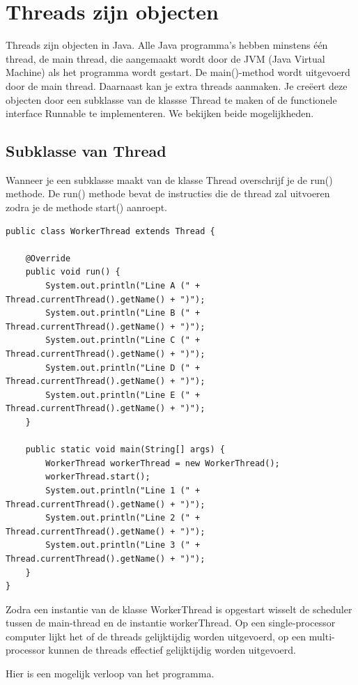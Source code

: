 \documentclass{tstextbook}
\begin{document}
\section{Threads zijn objecten}

Threads zijn objecten in Java. 
Alle Java programma's hebben minstens \'e\'en thread, de main thread, die aangemaakt wordt door de JVM (Java Virtual Machine) als het programma wordt gestart. De main()-method wordt uitgevoerd door de main thread. 
Daarnaast kan je extra threads aanmaken.
Je cre\"eert deze objecten
door een subklasse van de klassse Thread te maken of de functionele interface Runnable te implementeren. We bekijken beide mogelijkheden.

\subsection{Subklasse van Thread}

Wanneer je een subklasse maakt van de klasse Thread overschrijf je de run() methode. De run() methode bevat de instructies die de thread zal uitvoeren zodra je de methode start() aanroept.

\begin{lstlisting}
public class WorkerThread extends Thread {

	@Override
	public void run() {
		System.out.println("Line A (" + Thread.currentThread().getName() + ")");
		System.out.println("Line B (" + Thread.currentThread().getName() + ")");
		System.out.println("Line C (" + Thread.currentThread().getName() + ")");
		System.out.println("Line D (" + Thread.currentThread().getName() + ")");
		System.out.println("Line E (" + Thread.currentThread().getName() + ")");
	}

	public static void main(String[] args) {
		WorkerThread workerThread = new WorkerThread();
		workerThread.start();
		System.out.println("Line 1 (" + Thread.currentThread().getName() + ")");
		System.out.println("Line 2 (" + Thread.currentThread().getName() + ")");
		System.out.println("Line 3 (" + Thread.currentThread().getName() + ")");
	}
}
\end{lstlisting}

Zodra een instantie van de klasse WorkerThread is opgestart wisselt de scheduler tussen de main-thread en de instantie workerThread. Op een single-processor computer lijkt het of de threads gelijktijdig worden uitgevoerd, op een multi-processor kunnen de threads effectief gelijktijdig worden uitgevoerd.

Hier is een mogelijk verloop van het programma. 
\end{document}
